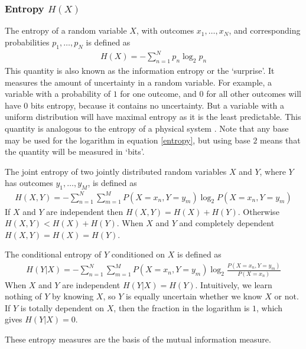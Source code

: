         \subsubsection{Entropy $H(X)$}
        The entropy of a random variable $X$, with outcomes $x_1, \dots, x_N$, and corresponding probabilities $p_1, \dots, p_N$ is defined as
        \begin{align}\label{entropy}
        H(X) = -\sum_{n=1}^N p_n \log _2 p_n
        \end{align}
        This quantity is also known as the information entropy or the `surprise'. It measures the amount of uncertainty in a random variable. For example, a variable with a probability of $1$ for one outcome, and $0$ for all other outcomes will have 0 bits entropy, because it contains no uncertainty. But a variable with a uniform distribution will have maximal entropy as it is the least predictable. This quantity is analogous to the entropy of a physical system  \parencite{shannon}. Note that any base may be used for the logarithm in equation \ref{entropy}, but using base $2$ means that the quantity will be measured in `bits'.

        The joint entropy of two jointly distributed random variables $X$ and $Y$, where $Y$ has outcomes $y_1, \dots, y_M$, is defined as
        \begin{align}\label{joint_entropy}
        H(X, Y) = -\sum_{n=1}^N \sum_{m=1}^M P(X=x_n, Y=y_m) \log _2 P(X=x_n, Y=y_m)
        \end{align}
        If $X$ and $Y$ are independent then $H(X,Y) = H(X) + H(Y)$. Otherwise $H(X,Y) < H(X) + H(Y)$. When $X$ and $Y$ and completely dependent $H(X,Y) = H(X) = H(Y)$.

        The conditional entropy of $Y$ conditioned on $X$ is defined as
        \begin{align}
        H(Y|X) = -\sum_{n=1}^N \sum_{m=1}^M P(X=x_n, Y=y_m) \log _2 \frac{P(X=x_n, Y=y_m)}{P(X=x_n)}
        \end{align}
        When $X$ and $Y$ are independent $H(Y|X) = H(Y)$. Intuitively, we learn nothing of $Y$ by knowing $X$, so $Y$ is equally uncertain whether we know $X$ or not. If $Y$ is totally dependent on $X$, then the fraction in the logarithm is $1$, which gives $H(Y|X) = 0$.

        These entropy measures are the basis of the mutual information measure.

